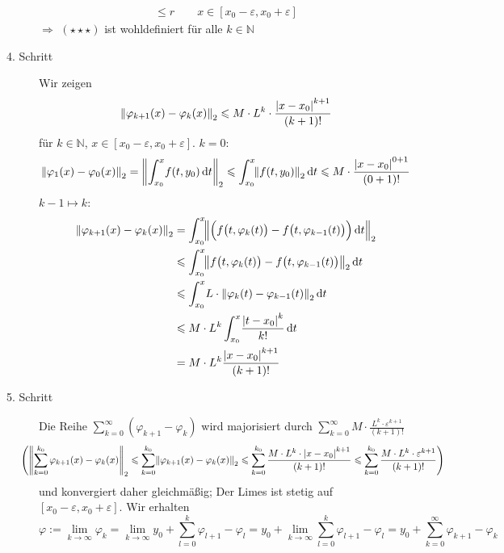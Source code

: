 \begin{description}
\begin{align*}
		\le r \qquad x \in [x_0 -\varepsilon, x_0 +\varepsilon]
	\end{align*}
	$\Rightarrow $ $(\star\star\star)$ ist wohldefiniert für alle $k \in \mathds{N}$
	\item[4. Schritt] Wir zeigen 
	\begin{align*}
		\norm[2]{\varphi_{k+1}(x)- \varphi_k(x)} \le M \cdot L^k \cdot \frac{\abs*{x-x_0}^{k+1} }{(k+1)!} 
	\end{align*}
	für $k \in \mathds{N}$, $x \in [x_0 -\varepsilon, x_0 +\varepsilon]$. $k=0$: 
	\[
		\norm[2]{\varphi_1(x) - \varphi_0(x)} = \norm[2]{\int_{x_0} ^{x} \! f(t,y_0)  \, \mathrm{d}t}  \le \int_{x_0} ^{x} \! \norm[2]{f(t,y_0)}  \, \mathrm{d}t 
		\le M \cdot \frac{\abs*{x-x_0}^{0+1} }{(0+1)!}
	\]
	$k-1 \mapsto k$:
	\begin{align*}
		\norm[2]{\varphi_{k+1}(x) - \varphi_k(x)} &= \int_{x_0} ^{x} \! \norm[2]{\Big(f\big(t, \varphi_k(t)\big) - f\big(t, \varphi_{k-1}(t)\big)\Big)  \, \mathrm{d}t} \\
		&\le \int_{x_0} ^{x} \! \norm[2]{f\big(t,\varphi_k(t)\big) -f\big(t, \varphi_{k-1}(t)\big) }  \, \mathrm{d}t \\
		&\le  \int_{x_0} ^{x} \! L \cdot \norm[2]{\varphi_k(t) - \varphi_{k-1}(t)}  \, \mathrm{d}t \\
		&\le M \cdot L^k \int_{x_0} ^{x} \! \frac{\abs*{t-x_0}^k}{k!}  \, \mathrm{d}t \\
		&= M \cdot L^k \frac{\abs*{x-x_0}^{k+1} }{(k+1)!} 
	\end{align*}
	\item[5. Schritt] Die Reihe $\sum_{k=0}^{\infty} (\varphi_{k+1} - \varphi_{k})$ wird majorisiert durch 
	$\sum_{k=0}^{\infty} M \cdot \frac{L^k \cdot \varepsilon^{k+1}}{(k+1)!}  $
	\begin{align*}
		\hspace{-2em}\enbrace*{\norm[2]{\sum_{k=0}^{k_0} \varphi_{k+1}(x) - \varphi_{k}(x)} \le \sum_{k=0}^{k_0}  \norm[2]{\varphi_{k+1}(x) - \varphi_{k}(x)}  \le  \sum_{k=0}^{k_0}
		\frac{M \cdot L^k \cdot \abs*{x-x_0}^{k+1} }{(k+1)!}  \le \sum_{k=0}^{k_0} \frac{M \cdot L^k \cdot \varepsilon^{k+1}}{(k+1)!} }
	\end{align*}
	und konvergiert daher gleichmäßig; Der Limes ist stetig auf $[x_0 -\varepsilon, x_0 +\varepsilon]$. Wir erhalten 
	\[
		\varphi := \lim_{ k \to \infty} \varphi_k =  \lim_{ k \to \infty} y_0 + \sum_{l=0}^{k} \varphi_{l+1}- \varphi_l = y_0 + \lim_{ k \to \infty} \sum_{l=0}^{k}
		\varphi_{l+1} - \varphi_l = y_0 + \sum_{k=0}^{\infty} \varphi_{k+1} - \varphi_{k}
\]
\end{description}
